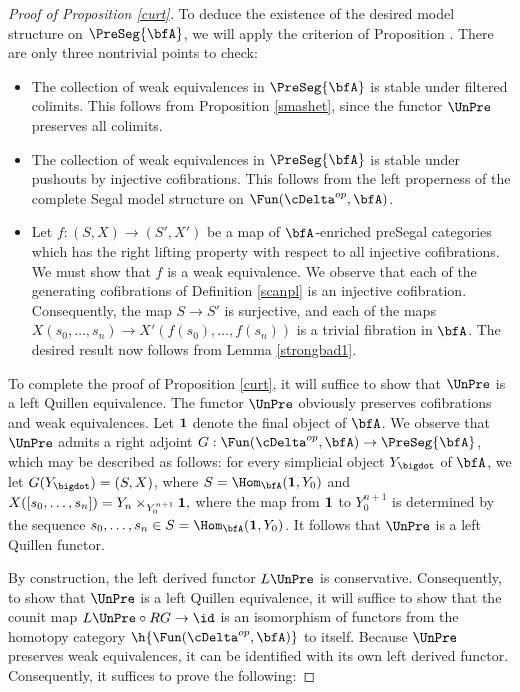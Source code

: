 \begin{proof}[Proof of Proposition \ref{curt}]
To deduce the existence of the desired model structure on $\PreSeg{\bfA}$, we will apply
the criterion of Proposition . There are only three nontrivial points to check:
\begin{itemize}
\item[$(1)$] The collection of weak equivalences in $\PreSeg{\bfA}$ is stable under filtered colimits.
This follows from Proposition \ref{smashet}, since the functor $\UnPre$ preserves all colimits.
\item[$(2)$] The collection of weak equivalences in $\PreSeg{\bfA}$ is stable under pushouts by injective cofibrations. This follows from the left properness of the complete Segal model structure on $\Fun( \cDelta^{op}, \bfA)$. 
\item[$(3)$] Let $f: (S,X) \rightarrow (S', X')$ be a map of $\bfA$-enriched preSegal categories which has the right lifting property with respect to all injective cofibrations. We must show that $f$ is a weak equivalence. We observe that each of the generating cofibrations of Definition 
\ref{scanpl} is an injective cofibration. Consequently, the map $S \rightarrow S'$ is surjective, and
each of the maps $X(s_0, \ldots, s_n) \rightarrow X'( f(s_0), \ldots, f(s_n) )$ is a trivial fibration
in $\bfA$. The desired result now follows from Lemma \ref{strongbad1}.
\end{itemize}

To complete the proof of Proposition \ref{curt}, it will suffice to show that
$\UnPre$ is a left Quillen equivalence. The functor $\UnPre$ obviously preserves cofibrations and weak equivalences. Let ${\bf 1}$ denote the final object of $\bfA$.
We observe that $\UnPre$ admits a right adjoint
$G: \Fun( \cDelta^{op}, \bfA) \rightarrow \PreSeg{\bfA}$, which may be described as follows:
for every simplicial object $Y_{\bigdot}$ of $\bfA$, we let
$G(Y_{\bigdot}) = (S, X)$, where $S = \Hom_{\bfA}( {\bf 1}, Y_0)$ and
$X( [ s_0, \ldots, s_n] ) = Y_{n} \times_{ Y_0^{n+1}} {\bf 1},$ where the map
from ${\bf 1}$ to $Y_0^{n+1}$ is determined by the sequence $s_0, \ldots, s_n \in 
S = \Hom_{\bfA}( {\bf 1}, Y_0)$. It follows that $\UnPre$ is a left Quillen functor.

By construction, the left derived functor $L \UnPre$ is conservative.
Consequently, to show that $\UnPre$ is a left Quillen equivalence, it will suffice
to show that the counit map $L \UnPre \circ RG \rightarrow \id$ is
an isomorphism of functors from the homotopy category $\h{ \Fun( \cDelta^{op}, \bfA) }$
to itself. Because $\UnPre$ preserves weak equivalences, it can be identified
with its own left derived functor. Consequently, it suffices to prove the following:


\end{proof}
